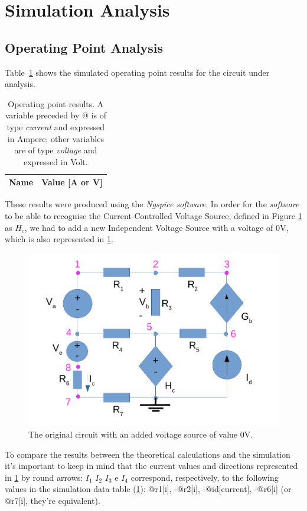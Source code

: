\section{Simulation Analysis}
\label{sec:simulation}

\subsection{Operating Point Analysis}

Table~\ref{tab:op} shows the simulated operating point results for the circuit under analysis.

\begin{table}[htb!]
  \centering
  \begin{tabular}{|l|r|}
    \hline    
    {\bf Name} & {\bf Value [A or V]} \\ \hline
    
  \end{tabular}
  \caption{Operating point results. A variable preceded by @ is of type {\em current}
    and expressed in Ampere; other variables are of type {\it voltage} and expressed in
    Volt.}
  \label{tab:op}
\end{table}

These results were produced using the \textit{Ngspice software}. In order for the \textit{software} to be able to recognise the Current-Controlled Voltage Source, defined in Figure \ref{fig2} as $H_c$, we had to add a new Independent Voltage Source with a voltage of 0V, which is also represented in \ref{fig2}.


\begin{figure}[h] \centering
\includegraphics[width=0.4\linewidth]{t1-2.pdf}
\caption{The original circuit with an added voltage source of value 0V.}
\label{fig2}
\end{figure}


To compare the results between the theoretical calculations and the simulation it's important to keep in mind that the current values and directions represented in \ref{fig2} by round arrows: $I_1$ $I_2$ $I_3$ e $I_4$ correspond, respectively, to the following values in the simulation data table (\ref{tab:op}): @r1[i], -@r2[i], -@id[current], -@r6[i] (or @r7[i], they're equivalent).


